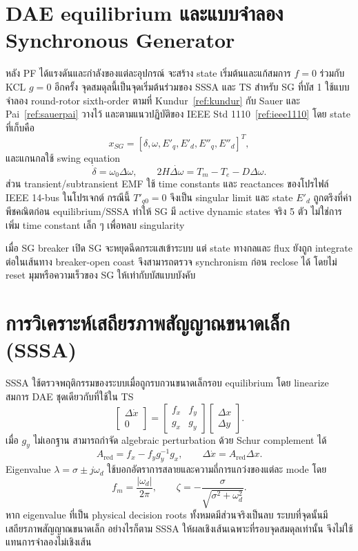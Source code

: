 \documentclass[12pt,a4paper]{article}
\begin{document}
\section{DAE equilibrium และแบบจำลอง Synchronous Generator}
หลัง PF ได้แรงดันและกำลังของแต่ละอุปกรณ์ จะสร้าง state เริ่มต้นและแก้สมการ $f=0$ ร่วมกับ KCL $g=0$ อีกครั้ง จุดสมดุลนี้เป็นจุดเริ่มต้นร่วมของ SSSA และ TS สำหรับ SG ที่บัส 1 ใช้แบบจำลอง round-rotor sixth-order ตามที่ Kundur~\ref{ref:kundur} กับ Sauer และ Pai~\ref{ref:sauerpai} วางไว้ และตามแนวปฏิบัติของ IEEE Std 1110~\ref{ref:ieee1110} โดย state ที่เก็บคือ
\begin{equation}
x_{SG}=[\delta,\omega,E'_q,E'_d,E''_q,E''_d]^T,
\end{equation}
และแกนกลใช้ swing equation
\begin{equation}
\dot{\delta}=\omega_0\Delta\omega,\qquad
2H\dot{\Delta\omega}=T_m-T_e-D\Delta\omega.
\label{eq:swing_summary}
\end{equation}
ส่วน transient/subtransient EMF ใช้ time constants และ reactances ของโปรไฟล์ IEEE 14-bus ในโปรเจกต์ กรณีนี้ $T'_{q0}=0$ จึงเป็น singular limit และ state $E'_d$ ถูกตรึงที่ค่าพีชคณิตก่อน equilibrium/SSSA ทำให้ SG มี active dynamic states จริง 5 ตัว ไม่ใช่การเพิ่ม time constant เล็ก ๆ เพื่อหลบ singularity

เมื่อ SG breaker เปิด SG จะหยุดฉีดกระแสเข้าระบบ แต่ state ทางกลและ flux ยังถูก integrate ต่อในเส้นทาง breaker-open coast จึงสามารถตรวจ synchronism ก่อน reclose ได้ โดยไม่ reset มุมหรือความเร็วของ SG ให้เท่ากับบัสแบบบังคับ
\section{การวิเคราะห์เสถียรภาพสัญญาณขนาดเล็ก (SSSA)}
SSSA ใช้ตรวจพฤติกรรมของระบบเมื่อถูกรบกวนขนาดเล็กรอบ equilibrium โดย linearize สมการ DAE ชุดเดียวกับที่ใช้ใน TS
\begin{equation}
\begin{bmatrix}\Delta\dot{x}\\0\end{bmatrix}=
\begin{bmatrix}f_x&f_y\\g_x&g_y\end{bmatrix}
\begin{bmatrix}\Delta x\\\Delta y\end{bmatrix}.
\label{eq:sssa_full}
\end{equation}
เมื่อ $g_y$ ไม่เอกฐาน สามารถกำจัด algebraic perturbation ด้วย Schur complement ได้
\begin{equation}
A_{\mathrm{red}}=f_x-f_y g_y^{-1}g_x,
\qquad \Delta\dot{x}=A_{\mathrm{red}}\Delta x.
\label{eq:sssa_schur}
\end{equation}
Eigenvalue $\lambda=\sigma\pm j\omega_d$ ใช้บอกอัตราการสลายและความถี่การแกว่งของแต่ละ mode โดย
\begin{equation}
f_m=\frac{|\omega_d|}{2\pi},\qquad
\zeta=-\frac{\sigma}{\sqrt{\sigma^2+\omega_d^2}}.
\label{eq:modalmetrics}
\end{equation}
หาก eigenvalue ที่เป็น physical decision roots ทั้งหมดมีส่วนจริงเป็นลบ ระบบที่จุดนั้นมีเสถียรภาพสัญญาณขนาดเล็ก อย่างไรก็ตาม SSSA ให้ผลเชิงเส้นเฉพาะที่รอบจุดสมดุลเท่านั้น จึงไม่ใช้แทนการจำลองไม่เชิงเส้น
\end{document}
